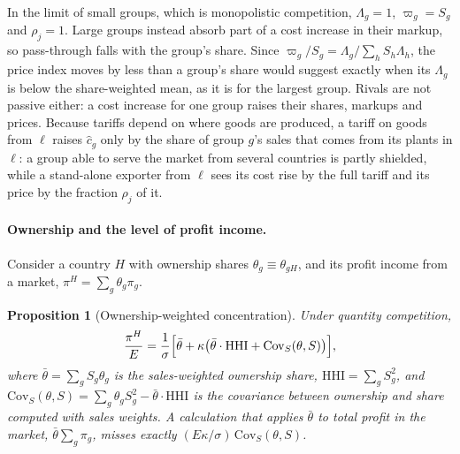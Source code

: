 \documentclass[11pt]{article}
\newtheorem{proposition}{Proposition}
\theoremstyle{definition}
\theoremstyle{remark}
\begin{document}
\noindent In the limit of small groups, which is monopolistic competition,
$\Lambda_g=1$, $\varpi_g=S_g$ and $\rho_j=1$. Large groups instead absorb part of a cost
increase in their markup, so pass-through falls with the group's share. Since
$\varpi_g/S_g=\Lambda_g/\sum_h S_h\Lambda_h$, the price index moves by less than a group's
share would suggest exactly when its $\Lambda_g$ is below the share-weighted mean, as it is
for the largest group. Rivals are not passive either: a cost increase for one group raises their
shares, markups and prices. Because tariffs depend on where goods are produced, a tariff on goods from
$\ell$ raises $\hat c_g$ only by the share of group $g$'s sales that comes from its
plants in $\ell$: a group able to serve the market from several countries is partly
shielded, while a stand-alone exporter from $\ell$ sees its cost rise by the full tariff and its
price by the fraction $\rho_j$ of it.

\paragraph{Ownership and the level of profit income.} Consider a country $H$ with
ownership shares $\theta_g\equiv\theta_{gH}$, and its profit income from a market,
$\pi^H=\sum_g\theta_g\pi_g$.

\begin{proposition}[Ownership-weighted concentration]\label{prop:ownership}
Under quantity competition,
\begin{equation}
  \frac{\pi^H}{E}=\frac{1}{\sigma}\Bigl[\bar\theta
  +\kappa\bigl(\bar\theta\cdot\mathrm{HHI}+\mathrm{Cov}_S(\theta,S)\bigr)\Bigr],
  \label{eq:decomp}
\end{equation}
where $\bar\theta=\sum_gS_g\theta_g$ is the sales-weighted ownership share,
$\mathrm{HHI}=\sum_gS_g^2$, and
$\mathrm{Cov}_S(\theta,S)=\sum_g\theta_gS_g^2-\bar\theta\cdot\mathrm{HHI}$ is the
covariance between ownership and share computed with sales weights. A calculation that
applies $\bar\theta$ to total profit in the market, $\bar\theta\sum_g\pi_g$, misses
exactly $(E\kappa/\sigma)\,\mathrm{Cov}_S(\theta,S)$.
\end{proposition}
\end{document}
